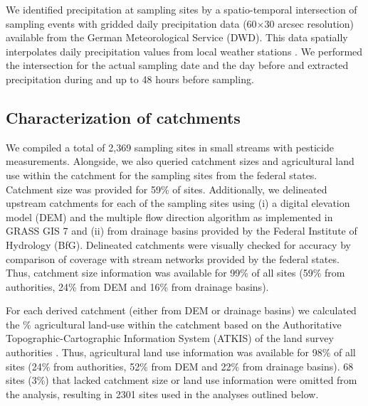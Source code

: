 \documentclass[journal=esthag,manuscript=article]{achemso}
\begin{document}
We identified precipitation at sampling sites by a spatio-temporal intersection of sampling events with gridded daily precipitation data (60$\times$30 arcsec resolution) available from the German Meteorological Service (DWD).
This data spatially interpolates daily precipitation values from local weather stations \citep{rauthe_central_2013}. 
We performed the intersection for the actual sampling date and the day before and extracted precipitation during and up to 48 hours before sampling. 


\subsection{Characterization of catchments}
We compiled a total of 2,369 sampling sites in small streams with pesticide measurements. %
Alongside, we also queried catchment sizes and agricultural land use within the catchment for the sampling sites from the federal states. %
Catchment size was provided for 59\% of sites. 
Additionally, we delineated upstream catchments for each of the sampling sites using (i) a digital elevation model (DEM) \citep{eea_digital_2013} and the multiple flow direction algorithm \citep{holmgren_multiple_1994} as implemented in GRASS GIS 7 \citep{neteler_grass_2012} and (ii) from drainage basins provided by the Federal Institute of Hydrology (BfG). 
Delineated catchments were visually checked for accuracy by comparison of coverage with stream networks provided by the federal states.
Thus, catchment size information was available for 99\% of all sites (59\% from authorities, 24\% from DEM and 16\% from drainage basins). 

For each derived catchment (either from DEM or drainage basins) we calculated the \% agricultural land-use within the catchment based on the Authoritative Topographic-Cartographic Information System (ATKIS) of the land survey authorities \citep{adv_atkis_2016}. 
Thus, agricultural land use information was available for 98\% of all sites (24\% from authorities, 52\% from DEM and 22\% from drainage basins). 
68 sites (3\%) that lacked catchment size or land use information were omitted from the analysis, resulting in 2301 sites used in the analyses outlined below.
\end{document}
